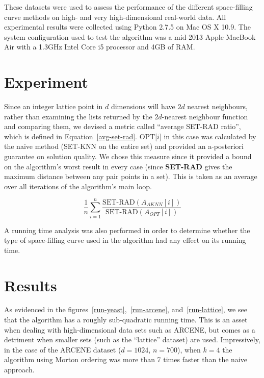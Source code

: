 \documentclass[10pt]{article}
\begin{document}
These datasets were used to assess the performance of the different space-filling curve methods on high- and very high-dimensional real-world data. All experimental results were collected using Python 2.7.5 on Mac OS X 10.9. The system configuration used to test the algorithm was a mid-2013 Apple MacBook Air with a 1.3GHz Intel Core i5 processor and 4GB of RAM.

\section{Experiment}

Since an integer lattice point in $d$ dimensions will have $2d$ nearest neighbours, rather than examining the lists returned by the $2d$-nearest neighbour function and comparing them, we devised a metric called ``average SET-RAD ratio'', which is defined in Equation~\ref{avg-set-rad}. OPT[$i$] in this case was calculated by the naive method (SET-KNN on the entire set) and provided an a-posteriori guarantee on solution quality. We chose this measure since it provided a bound on the algorithm’s worst result in every case (since {\bf SET-RAD} gives the maximum distance between any pair points in a set). This is taken as an average over all iterations of the algorithm’s main loop. 

\begin{equation}
  \label{avg-set-rad}
  \frac{1}{n} \sum_{i=1}^n \frac{\text{SET-RAD}(A_{AKNN}[i])}{\text{SET-RAD}(A_{OPT}[i])}
\end{equation}

A running time analysis was also performed in order to determine whether the type of space-filling curve used in the algorithm had any effect on its running time.

\section{Results}

As evidenced in the figures~\ref{run-yeast},~\ref{run-arcene}, and~\ref{run-lattice}, we see that the algorithm has a roughly sub-quadratic running time. This is an asset when dealing with high-dimensional data sets such as ARCENE, but comes as a detriment when smaller sets (such as the ``lattice'' dataset) are used. Impressively, in the case of the ARCENE dataset ($d = 1024$, $n = 700$), when $k=4$ the algorithm using Morton ordering was more than 7 times faster than the naive approach. \\[10pt]
\end{document}
